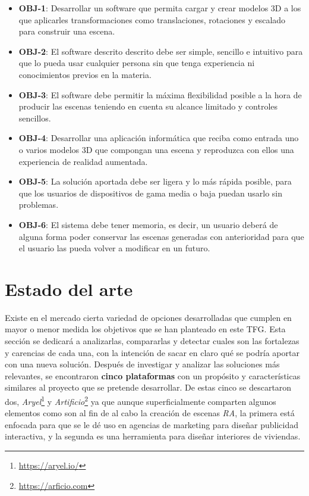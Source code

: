 \begin{itemize}
    \item \textbf{OBJ-1}: Desarrollar un software que permita cargar y crear modelos 3D a los que aplicarles transformaciones como translaciones, rotaciones y escalado para construir una escena.
    \item \textbf{OBJ-2}: El software descrito descrito debe ser simple, sencillo e intuitivo para que lo pueda usar cualquier persona sin que tenga experiencia ni conocimientos previos en la materia.
    \item \textbf{OBJ-3}: El software debe permitir la máxima flexibilidad posible a la hora de producir las escenas teniendo en cuenta su alcance limitado y controles sencillos.
    \item \textbf{OBJ-4}: Desarrollar una aplicación informática que reciba como entrada uno o varios modelos 3D que compongan una escena y reproduzca con ellos una experiencia de realidad aumentada.
    \item \textbf{OBJ-5}: La solución aportada debe ser ligera y lo más rápida posible, para que los usuarios de dispositivos de gama media o baja puedan usarlo sin problemas.
    \item \textbf{OBJ-6}: El sistema debe tener memoria, es decir, un usuario deberá de alguna forma poder conservar las escenas generadas con anterioridad para que el usuario las pueda volver a modificar en un futuro.
\end{itemize}

\section{Estado del arte}

Existe en el mercado cierta variedad de opciones desarrolladas que cumplen en mayor o menor medida los objetivos que se han planteado en este TFG. Esta sección se dedicará a analizarlas, compararlas y detectar cuales son las fortalezas y carencias de cada una, con la intención de sacar en claro qué se podría aportar con una nueva solución. Después de investigar y analizar las soluciones más relevantes, se encontraron \textbf{cinco plataformas} con un propósito y características similares al proyecto que se pretende desarrollar. De estas cinco se descartaron dos, \textit{Aryel}\footnote{\url{https://aryel.io/}} y \textit{Artificio}\footnote{\url{https://arficio.com}} ya que aunque superficialmente comparten algunos elementos como son al fin de al cabo la creación de escenas \textit{RA}, la primera está enfocada para que se le dé uso en agencias de marketing para diseñar publicidad interactiva, y la segunda es una herramienta para diseñar interiores de viviendas.


